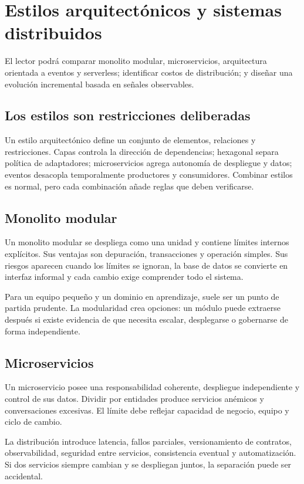 \chapter{Estilos arquitectónicos y sistemas distribuidos}

\begin{objetivos}
El lector podrá comparar monolito modular, microservicios, arquitectura orientada a eventos y serverless; identificar costos de distribución; y diseñar una evolución incremental basada en señales observables.
\end{objetivos}

\section{Los estilos son restricciones deliberadas}
Un estilo arquitectónico define un conjunto de elementos, relaciones y restricciones. Capas controla la dirección de dependencias; hexagonal separa política de adaptadores; microservicios agrega autonomía de despliegue y datos; eventos desacopla temporalmente productores y consumidores. Combinar estilos es normal, pero cada combinación añade reglas que deben verificarse.

\section{Monolito modular}
Un monolito modular se despliega como una unidad y contiene límites internos explícitos. Sus ventajas son depuración, transacciones y operación simples. Sus riesgos aparecen cuando los límites se ignoran, la base de datos se convierte en interfaz informal y cada cambio exige comprender todo el sistema.

Para un equipo pequeño y un dominio en aprendizaje, suele ser un punto de partida prudente. La modularidad crea opciones: un módulo puede extraerse después si existe evidencia de que necesita escalar, desplegarse o gobernarse de forma independiente.

\section{Microservicios}
Un microservicio posee una responsabilidad coherente, despliegue independiente y control de sus datos. Dividir por entidades produce servicios anémicos y conversaciones excesivas. El límite debe reflejar capacidad de negocio, equipo y ciclo de cambio.

La distribución introduce latencia, fallos parciales, versionamiento de contratos, observabilidad, seguridad entre servicios, consistencia eventual y automatización. Si dos servicios siempre cambian y se despliegan juntos, la separación puede ser accidental.


